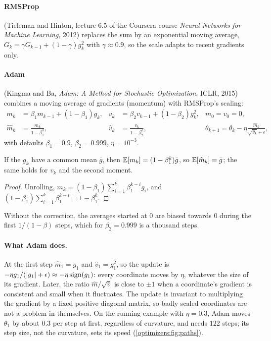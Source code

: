 \begin{notechapter}
\paragraph{RMSProp} (Tieleman and Hinton, lecture 6.5 of the Coursera course \emph{Neural
Networks for Machine Learning}, 2012) replaces the sum by an exponential moving average,
$G_k = \gamma G_{k-1} + (1 - \gamma)g_k^2$ with $\gamma\approx0.9$, so the scale adapts to recent gradients only.

\paragraph{Adam} (Kingma and Ba, \emph{Adam: A Method for Stochastic Optimization}, ICLR,
2015) combines a moving average of gradients (momentum) with RMSProp's scaling:
\begin{align*}
  m_k &= \beta_1m_{k-1} + (1 - \beta_1)g_k, & v_k &= \beta_2v_{k-1} + (1 - \beta_2)g_k^2, & m_0 = v_0 = 0,\\
  \hat m_k &= \frac{m_k}{1 - \beta_1^k}, & \hat v_k &= \frac{v_k}{1 - \beta_2^k}, & \theta_{k+1} = \theta_k - \eta\frac{\hat m_k}{\sqrt{\hat v_k} + \epsilon},
\end{align*}
with defaults $\beta_1 = 0.9$, $\beta_2 = 0.999$, $\eta = 10^{-3}$.

\begin{proposition}\label{optimizers:prop:bias}
If the $g_k$ have a common mean $\bar g$, then $\mathbb{E}[m_k] = (1 - \beta_1^k)\bar g$, so $\mathbb{E}[\hat m_k] = \bar g$; the same holds for $v_k$
and the second moment.
\end{proposition}

\begin{proof}
Unrolling, $m_k = (1 - \beta_1)\sum_{i=1}^k\beta_1^{k-i}g_i$, and $(1 - \beta_1)\sum_{i=1}^k\beta_1^{k-i} = 1 - \beta_1^k$.
\end{proof}

Without the correction, the averages started at $0$ are biased towards $0$ during the first
$1/(1 - \beta)$ steps, which for $\beta_2 = 0.999$ is a thousand steps.

\paragraph{What Adam does.} At the first step $\hat m_1 = g_1$ and $\hat v_1 = g_1^2$, so the update is $-\eta g_1/(\left|g_1\right| + \epsilon)\approx-\eta\operatorname{sign}(g_1)$:
every coordinate moves by $\eta$, whatever the size of its gradient. Later, the ratio $\hat m/\sqrt{\hat v}$ is
close to $\pm1$ when a coordinate's gradient is consistent and small when it fluctuates. The
update is invariant to multiplying the gradient by a fixed positive diagonal matrix, so
badly scaled coordinates are not a problem in themselves. On the running example with
$\eta = 0.3$, Adam moves $\theta_1$ by about $0.3$ per step at first, regardless of curvature, and needs $122$
steps; its step size, not the curvature, sets its speed (\cref{optimizers:fig:paths}).


\end{notechapter}
